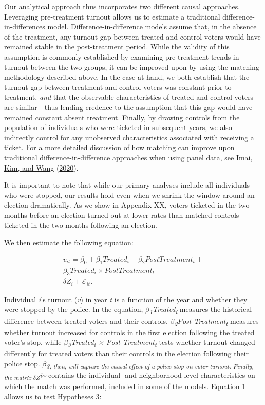 \documentclass[
  12pt,
]{article}
\begin{document}
Our analytical approach thus incorporates two different causal approaches. Leveraging pre-treatment turnout allows us to estimate a traditional difference-in-differences model. Difference-in-difference models assume that, in the absence of the treatment, any turnout gap between treated and control voters would have remained stable in the post-treatment period. While the validity of this assumption is commonly established by examining pre-treatment trends in turnout between the two groups, it can be improved upon by using the matching methodology described above. In the case at hand, we both establish that the turnout gap between treatment and control voters was constant prior to treatment, \emph{and} that the observable characteristics of treated and control voters are similar---thus lending credence to the assumption that this gap would have remained constant absent treatment. Finally, by drawing controls from the population of individuals who were ticketed in subsequent years, we also indirectly control for any unobserved characteristics associated with receiving a ticket. For a more detailed discussion of how matching can improve upon traditional difference-in-difference approaches when using panel data, see \protect\hyperlink{ref-Imai2020}{Imai, Kim, and Wang} (\protect\hyperlink{ref-Imai2020}{2020}).

It is important to note that while our primary analyses include all individuals who were stopped, our results hold even when we shrink the window around an election dramatically. As we show in Appendix XX, voters ticketed in the two months before an election turned out at lower rates than matched controls ticketed in the two months following an election.

We then estimate the following equation:

\begin{gather}
\label{eq:1}
v_{it}=\beta_0+\beta_1Treated_{i}+\beta_2Post Treatment_{t} + \nonumber \\
\beta_3Treated_{i}\times Post Treatment_{t} + \\
\delta{Z}_{i} + \mathcal{E}_{it}. \nonumber
\end{gather}

Individual \emph{i}'s turnout (\emph{v}) in year \emph{t} is a function of the year and whether they were stopped by the police. In the equation, \emph{\(\beta\)\textsubscript{1}Treated\textsubscript{i}} measures the historical difference between treated voters and their controls. \emph{\(\beta\)\textsubscript{2}Post Treatment\textsubscript{t}} measures whether turnout increased for controls in the first election following the treated voter's stop, while \emph{\(\beta\)\textsubscript{3}Treated\textsubscript{i} × Post Treatment\textsubscript{t}} tests whether turnout changed differently for treated voters than their controls in the election following their police stop. \emph{\(\beta\)\textsubscript{3\emph{, then, will capture the causal effect of a police stop on voter turnout. Finally, the matrix }\(\delta\)Z}i\textasciitilde{}} contains the individual- and neighborhood-level characteristics on which the match was performed, included in some of the models. Equation 1 allows us to test Hypotheses 3:
\end{document}
